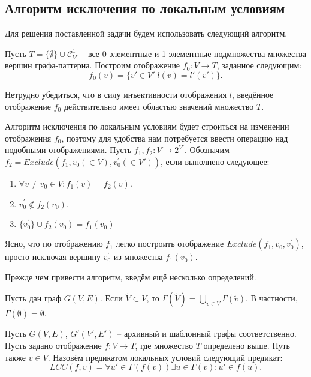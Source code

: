 \subsection{Алгоритм исключения по локальным условиям}

Для решения поставленной задачи будем использовать следующий алгоритм.

Пусть $T = \{\emptyset\} \cup \mathcal{C}_{V'}^1$ -- все 0-элементные и 1-элементные подмножества множества вершин графа-паттерна. Построим отображение $f_0 : V \to T$, заданное следующим:
\begin{equation}
f_0(v) = \{v' \in V' | l(v) = l'(v')\} .
\end{equation}

Нетрудно убедиться, что в силу инъективности отображения $l$, введённое отображение $f_0$ действительно имеет областью значений множество $T$.

Алгоритм исключения по локальным условиям будет строиться на изменении отображения $f_0$, поэтому для удобства нам потребуется ввести операцию над подобными отображениями. Пусть $f_1, f_2 : V \to 2^{V'}$. Обозначим $f_2 = Exclude(f_1,\allowbreak v_0 (\in V), \allowbreak v^{\prime}_0 (\in V'))$, если выполнено следующее:
\begin{enumerate}
	\item $\forall v \ne v_0 \in V: f_1(v) = f_2(v)$.
	\item $v^{\prime}_0 \notin f_2(v_0)$.
	\item $\{v^{\prime}_0\} \cup f_2(v_0) = f_1(v_0)$
\end{enumerate}

Ясно, что по отображению $f_1$ легко построить отображение $Exclude(f_1,\allowbreak v_0,\allowbreak v^{\prime}_0)$, просто исключая вершину $v^{\prime}_0$ из множества $f_1(v_0)$.

Прежде чем привести алгоритм, введём ещё несколько определений.

\begin{defn}
	Пусть дан граф $G(V, E)$. Если $\widetilde{V} \subset V$, то $\Gamma(\widetilde{V}) = \bigcup\limits_{\widetilde{v} \in \widetilde{V}} \Gamma(\widetilde{v})$. В частности, $\Gamma(\emptyset) = \emptyset$.
\end{defn} 

\begin{defn}
	Пусть $G(V, E)$, $G'(V', E')$ -- архивный и шаблонный графы соответственно. Пусть задано отображение $f : V \to T$, где множество $T$ определено выше. Путь также $v \in V$. Назовём предикатом локальных условий следующий предикат:
	\begin{equation}
		LCC(f, v) = \forall u' \in \Gamma(f(v)) \exists u \in \Gamma(v) : u' \in f(u).
	\end{equation} 
\end{defn} 

